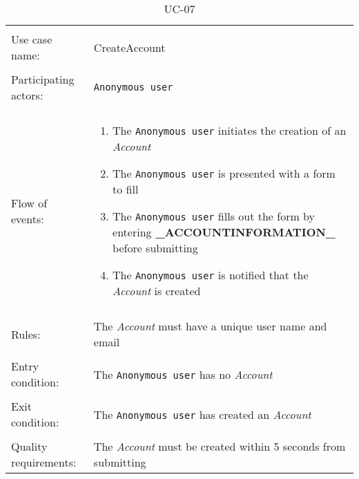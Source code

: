 \noindent
\begin{table}[h!]
\caption{UC-07}
\label{UC-07}
\begin{tabular}{ l p{8cm} } 
\hline       
\\                
Use case name:  & CreateAccount   \\   \hline  \\              
Participating actors:  & \texttt{Anonymous user} \\   \hline \\
Flow of events: & \begin{enumerate}
\item{The \texttt{Anonymous user} initiates the creation of an \textit{Account}}
\item{The \texttt{Anonymous user} is presented with a form to fill}
\item{The \texttt{Anonymous user} fills out the form by entering \textbf{\_ACCOUNTINFORMATION\_} before submitting} %
\item{The \texttt{Anonymous user} is notified that the \textit{Account} is created}
\end{enumerate}
\\   \hline \\
Rules: & The \textit{Account} must have a unique user name and email \\ \hline \\
Entry condition: & The \texttt{Anonymous user} has no \textit{Account} \\ \hline \\
Exit condition: & The \texttt{Anonymous user} has created an \textit{Account} \\ \hline \\
Quality requirements: & The \textit{Account} must be created within 5 seconds from submitting \\  \hline      
\end{tabular} \\
\end{table}

